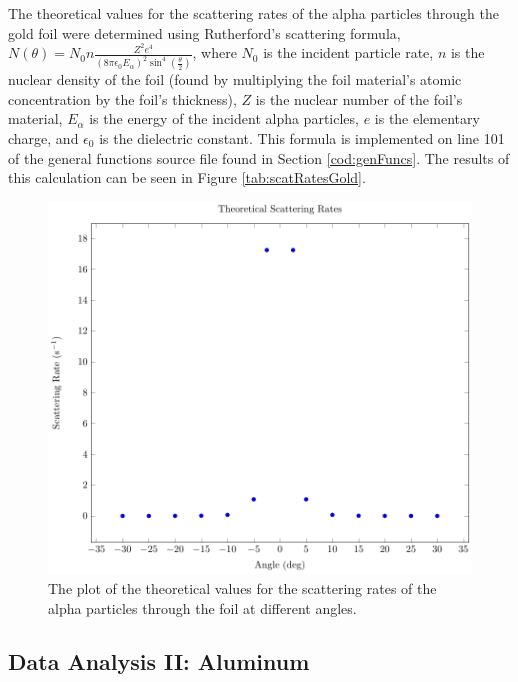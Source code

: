 \documentclass[a4paper]{article}
\begin{document}
\qq 

\qq The theoretical values for the scattering rates of the alpha particles
through the gold foil were determined using Rutherford's scattering formula, \(
N (\theta) = N_0 n \frac{Z^2 e^4}{(8 \pi \epsilon_0 E_{\alpha})^2 \sin^4
  \left( \frac{\theta}{2} \right)} \), where \( N_0 \) is the incident particle
rate, \( n \) is the nuclear density of the foil (found by multiplying the
foil material's atomic concentration by the foil's thickness), \( Z \) is the
nuclear number of the foil's material, \( E_{\alpha} \) is the energy of the
incident alpha particles, \( e \) is the elementary charge, and \( \epsilon_0 \)
is the dielectric constant. This formula is implemented on line 101 of the
general functions source file found in Section \ref{cod:genFuncs}. The results
of this calculation can be seen in Figure \ref{tab:scatRatesGold}.

\begin{figure}[H]
  \begin{center}
    \includegraphics[scale=0.8]{Plots/TheoreticalScatteringRates/theoScatRates.pdf}
  \end{center}
  \caption{The plot of the theoretical values for the scattering rates of the
    alpha particles through the foil at different angles.}
  \label{gph:scatRatesGold}
\end{figure}

\subsection{Data Analysis II: Aluminum}
\end{document}

